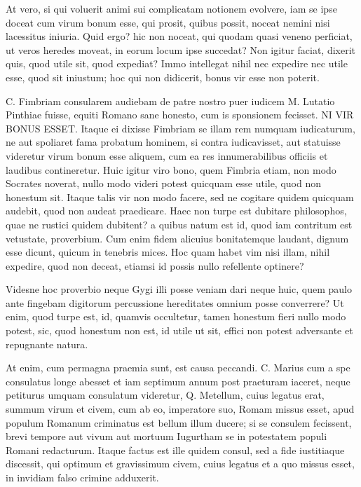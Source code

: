  At vero, si qui voluerit animi sui complicatam notionem evolvere, iam se ipse doceat cum virum bonum esse, qui prosit, quibus possit, noceat nemini nisi lacessitus iniuria. Quid ergo? hic non noceat, qui quodam quasi veneno perficiat, ut veros heredes moveat, in eorum locum ipse succedat? Non igitur faciat, dixerit quis, quod utile sit, quod expediat? Immo intellegat nihil nec expedire nec utile esse, quod sit iniustum; hoc qui non didicerit, bonus vir esse non poterit.

 C. Fimbriam consularem audiebam de patre nostro puer iudicem M. Lutatio Pinthiae fuisse, equiti Romano sane honesto, cum is sponsionem fecisset. NI VIR BONUS ESSET. Itaque ei dixisse Fimbriam se illam rem numquam iudicaturum, ne aut spoliaret fama probatum hominem, si contra iudicavisset, aut statuisse videretur virum bonum esse aliquem, cum ea res innumerabilibus officiis et laudibus contineretur. Huic igitur viro bono, quem Fimbria etiam, non modo Socrates noverat, nullo modo videri potest quicquam esse utile, quod non honestum sit. Itaque talis vir non modo facere, sed ne cogitare quidem quicquam audebit, quod non audeat praedicare. Haec non turpe est dubitare philosophos, quae ne rustici quidem dubitent? a quibus natum est id, quod iam contritum est vetustate, proverbium. Cum enim fidem alicuius bonitatemque laudant, dignum esse dicunt, quicum in tenebris mices. Hoc quam habet vim nisi illam, nihil expedire, quod non deceat, etiamsi id possis nullo refellente optinere?

 Videsne hoc proverbio neque Gygi illi posse veniam dari neque huic, quem paulo ante fingebam digitorum percussione hereditates omnium posse converrere? Ut enim, quod turpe est, id, quamvis occultetur, tamen honestum fieri nullo modo potest, sic, quod honestum non est, id utile ut sit, effici non potest adversante et repugnante natura.

 At enim, cum permagna praemia sunt, est causa peccandi. C. Marius cum a spe consulatus longe abesset et iam septimum annum post praeturam iaceret, neque petiturus umquam consulatum videretur, Q. Metellum, cuius legatus erat, summum virum et civem, cum ab eo, imperatore suo, Romam missus esset, apud populum Romanum criminatus est bellum illum ducere; si se consulem fecissent, brevi tempore aut vivum aut mortuum Iugurtham se in potestatem populi Romani redacturum. Itaque factus est ille quidem consul, sed a fide iustitiaque discessit, qui optimum et gravissimum civem, cuius legatus et a quo missus esset, in invidiam falso crimine adduxerit.

